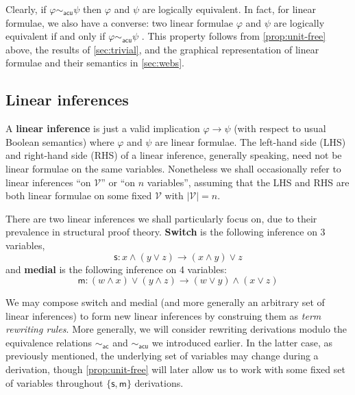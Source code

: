 \documentclass[a4paper, UKenglish, cleveref]{lipics-v2021}
\renewcommand{\phi}{\varphi}
\newcommand{\V}{\ensuremath{\mathcal{V}}}
\newcommand{\m}{\ensuremath{\mathsf{m}}}
\newcommand{\s}{\ensuremath{\mathsf{s}}}
\newcommand{\ac}{\ensuremath{\mathsf{ac}}}
\newcommand{\acu}{\ensuremath{\mathsf{acu}}}
\begin{document}
\begin{remark}
\label{acu-and-logical-equivalence}
Clearly, if $\phi \sim_\acu \psi$ then $\phi$ and $\psi$ are logically equivalent.
In fact, for linear formulae, we also have a converse: two linear formulae $\phi$ and $\psi$ are logically equivalent if and only if $\phi \sim_\acu \psi$ \cite{DasStr15:no-comp-lin-sys,DasStr16:no-compl-lin-sys}.
This property follows from \cref{prop:unit-free} above, the results of \cref{sec:trivial}, and the graphical representation of linear formulae and their semantics in \cref{sec:webs}.
\end{remark}

\subsection{Linear inferences}
A \textbf{linear inference}
%
is just a valid implication $\phi \to \psi$ (with respect to usual Boolean semantics) where $\phi$ and $\psi$ are linear formulae.
%
The left-hand side (LHS) and right-hand side (RHS) of a linear inference, generally speaking, need not be linear formulae on the same variables.
%
Nonetheless we shall occasionally refer to linear inferences ``on $\V$'' or ``on \(n\) variables'', assuming that the LHS and RHS are both linear formulae on some fixed \(\V\) with \(|\V| = n\).


There are two linear inferences we shall particularly focus on, due to their prevalence in structural proof theory. \textbf{Switch} is the following inference on 3 variables,
\begin{equation}\label{eq:switch}
\s : x \land (y \lor z) \to (x \land y) \lor z
\end{equation}
and \textbf{medial} is the following inference on 4 variables:
\begin{equation}\label{eq:medial}
\m : (w \land x) \lor (y \land z) \to (w \lor y) \land (x \lor z)
\end{equation}

We may compose switch and medial (and more generally an arbitrary set of linear inferences) to form new linear inferences by construing them as \emph{term rewriting rules}.
More generally, we will consider rewriting derivations modulo the equivalence relations $\sim_\ac$ and $\sim_\acu$ we introduced earlier.
In the latter case, as previously mentioned, the underlying set of variables may change during a derivation, though \cref{prop:unit-free} will later allow us to work with some fixed set of variables throughout $\{\s, \m\}$ derivations.
\end{document}
